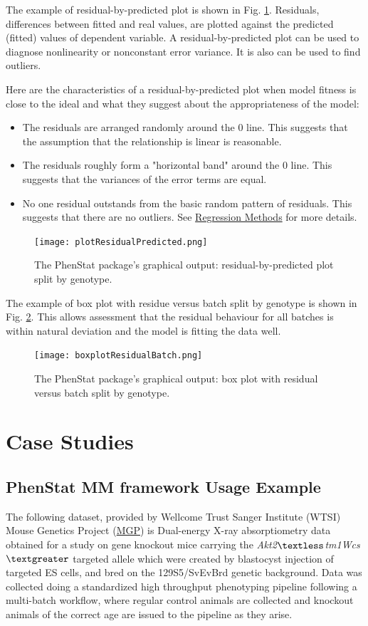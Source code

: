 \documentclass[12pt,a4paper]{article}
\begin{document}
The example of residual-by-predicted plot is shown in Fig. \ref{fig:13}. Residuals, differences between fitted and real values, are plotted against the predicted (fitted) values of dependent variable.  
A residual-by-predicted plot can be used to diagnose nonlinearity or nonconstant error variance. It is also can be used to find outliers. 

Here are the characteristics of a residual-by-predicted plot when model fitness is close to the ideal and what they suggest about the appropriateness of the model:
\begin{itemize}
\item The residuals are arranged randomly around the 0 line. This suggests that the assumption that the relationship is linear is reasonable.
\item The residuals roughly form a "horizontal band" around the 0 line. This suggests that the variances of the error terms are equal.
\item No one residual outstands from the basic random pattern of residuals. This suggests that there are no outliers. See \href{https://onlinecourses.science.psu.edu/stat501/node/36}{Regression Methods} for more details.
\end{itemize}
\begin{figure}[!htpb]%
\centerline{\texttt{[image: plotResidualPredicted.png]}}
\caption{The PhenStat package's graphical output: residual-by-predicted plot split by genotype.}\label{fig:13}
\end{figure}

The example of box plot with residue versus batch split by genotype is shown in Fig. \ref{fig:14}. This allows assessment that the residual behaviour for all batches is within natural deviation and the model is fitting the data well.
\begin{figure}[!htpb]%
\centerline{\texttt{[image: boxplotResidualBatch.png]}}
\caption{The PhenStat package's graphical output: box plot with residual versus batch split by genotype.}\label{fig:14}
\end{figure}
   
\section{Case Studies}
\subsection{PhenStat MM framework Usage Example}
The following dataset, provided by Wellcome Trust Sanger Institute (WTSI) Mouse Genetics Project (\href{http://www.sanger.ac.uk/resources/mouse/}{MGP}) 
is Dual-energy X-ray absorptiometry data obtained for a study on gene knockout mice carrying the \textit{Akt2$\textless$tm1Wcs$\textgreater$} targeted allele which were created by blastocyst 
injection of targeted ES cells, and bred on the 129S5\//SvEvBrd genetic background.  
Data was collected doing a standardized high throughput phenotyping pipeline following a multi-batch workflow, where regular control animals are collected and knockout animals of the correct age are issued to the pipeline as they arise.  
\end{document}
